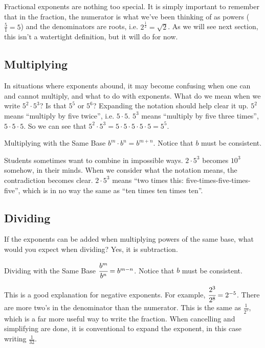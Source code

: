 


Fractional exponents are nothing too special.  It is simply important to remember that in the
fraction, the numerator is what we've been thinking of as powers ($\frac{5}{1}=5$) and the
denominators are roots, i.e. $2^{\frac{1}{2}}=\sqrt{2}$.  As we will see next section, this isn't 
a watertight definition, but it will do for now.

\subsection{Multiplying}
In situations where exponents abound, it may become confusing when one can and cannot
multiply, and what to do with exponents.  What do we mean when we write $5^2\cdot5^3$? 
Is that $5^5$ or $5^6$?  Expanding the notation should help clear it up.  $5^2$ means 
``multiply by five twice'', i.e. $5\cdot 5$.  $5^3$ means ``multiply by five three times'', $5\cdot
5\cdot 5$.  So we can see that $5^2\cdot5^3=5\cdot 5\cdot 5\cdot 5\cdot 5=5^5$.



\begin{derivation}{Multiplying with the Same Base}
$b^m\cdot b^n=b^{m+n}$.  Notice that $b$ must be consistent.
\end{derivation}


Students sometimes want to combine in impossible ways.  $2\cdot5^3$ becomes $10^3$ 
somehow, in their minds.  When we consider what the notation means, the contradiction
becomes clear.  $2\cdot5^3$ means ``two times this: five-times-five-times-five'', which is in no
way the same as ``ten times ten times ten''.

\subsection{Dividing}
If the exponents can be added when multiplying powers of the same base, what would you
expect when dividing?  Yes, it is subtraction.


\begin{derivation}{Dividing with the Same Base}
$\cfrac{b^m}{b^n}=b^{m-n}$.  Notice that $b$ must be consistent.
\end{derivation}


This is a good explanation for negative exponents.  For example, $\cfrac{2^3}{2^8}=2^{-5}$.
There are more two's in the denominator than the numerator.  This is the same as $\frac{1}{2^5}$,
which is a far more useful way to write the fraction.  When cancelling and simplifying are done,
it is conventional to expand the exponent, in this case writing $\frac{1}{32}$.

